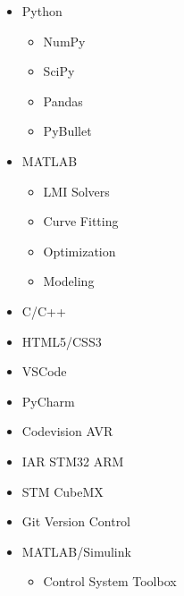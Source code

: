 \documentclass[10pt,a4paper,sans]{moderncv} %
\begin{document}
	\begin{cvcolumns}
		{
			\vspace{-0.5em}
				\begin{itemize}[nosep]
					\item Python
					\begin{itemize}[nosep]
						\item NumPy
						\item SciPy
						\item Pandas
						\item PyBullet
					\end{itemize}
					\item MATLAB
					\begin{itemize}[nosep]
						\item LMI Solvers
						\item Curve Fitting
						\item Optimization
						\item Modeling %
					\end{itemize}
					\item C/C++
					\item HTML5/CSS3
				\end{itemize}
		}
		{
			\vspace{-0.5em}
				\begin{itemize}[nosep]
					\item VSCode
					\item PyCharm
					\item Codevision AVR
					\item IAR STM32 ARM
					\item STM CubeMX
					\item Git Version Control
				\end{itemize}
		}
		{
			\vspace{-0.5em}
				\begin{itemize}[nosep]
					\item MATLAB/Simulink
					\begin{itemize}[nosep]
					    \item Control System Toolbox

\end{itemize}
\end{itemize}}
\end{cvcolumns}
\end{document}
